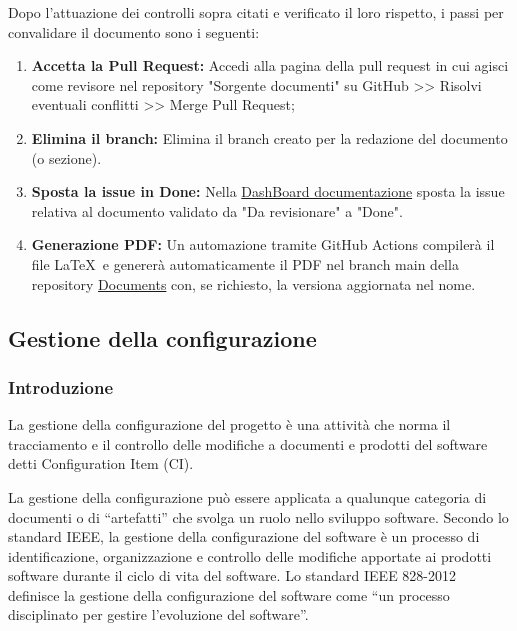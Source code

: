 \documentclass{article}
\begin{document}
Dopo l'attuazione dei controlli sopra citati e verificato il loro rispetto, i passi per convalidare il documento sono i seguenti:
\begin{enumerate}
<<<<<<< HEAD
    \item \textbf{Accetta la Pull Request:} Accedi alla pagina della pull request in cui agisci come revisore nel repository "Sorgente documenti" su GitHub >> Risolvi eventuali conflitti >> Merge Pull Request;
    \item \textbf{Elimina il branch: } Elimina il branch creato per la redazione del documento (o sezione).
    \item \textbf{Sposta la issue in Done:} Nella \href{https://github.com/orgs/ByteOps-swe/projects/1/views/1}{DashBoard documentazione} sposta la issue relativa al documento validato da "Da revisionare" a "Done".
    \item \textbf{Generazione PDF:} Un automazione tramite GitHub Actions compilerà il file   \LaTeX\ e genererà automaticamente il PDF nel branch main della repository \href{https://github.com/ByteOps-swe/Documents}{Documents} con, se richiesto, la versiona aggiornata nel nome.
\end{enumerate}
\subsection{Gestione della configurazione}
\subsubsection{Introduzione}
La gestione della configurazione del progetto è una attività che norma il tracciamento e il controllo delle modifiche a documenti e prodotti del software detti Configuration Item (CI).

La gestione della configurazione può essere applicata a qualunque categoria di documenti o di “artefatti” che svolga un ruolo nello sviluppo software.
Secondo lo standard IEEE, la gestione della configurazione del software è un processo di identificazione, organizzazione e controllo delle modifiche apportate ai prodotti software durante il ciclo di vita del software.
Lo standard IEEE 828-2012 definisce la gestione della configurazione del software come “un processo disciplinato per gestire l’evoluzione del software”.
\end{document}
